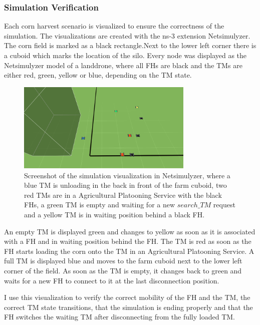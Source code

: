 \subsubsection*{Simulation Verification}
Each corn harvest scenario is visualized to ensure the correctness of the simulation.
The visualizations are created with the ns-3 extension Netsimulyzer.
The corn field is marked as a black rectangle.Next to the lower left corner there is a cuboid which marks the location of the silo.
Every node was displayed as the Netsimulyzer model of a landdrone, where all \ac{FH}s are black and the
\ac{TM}s are either red, green, yellow or blue, depending on the \ac{TM} state.
\begin{figure}[H]%
	\centering
	\includegraphics[width=0.75\textwidth]{figures/platooningScreen}
	\caption{Screenshot of the simulation visualization in Netsimulyzer, where a blue \acf{TM} is unloading in the back in front of the farm cuboid,
		two red \acp{TM} are in a Agricultural Platooning Service with the black \acf{FH}s,
		a green \ac{TM} is empty and waiting for a new $search\_TM$ request and a yellow \ac{TM} is in waiting position behind a black \ac{FH}.}
	\label{fig:PlatooningScreenshot}%
\end{figure}

An empty \ac{TM} is displayed green and changes to yellow as soon as it is associated with a \ac{FH} and in waiting position behind the \ac{FH}.
The \ac{TM} is red as soon as the \ac{FH} starts loading the corn onto the \ac{TM} in an Agricultural Platooning Service.
A full \ac{TM} is displayed blue and moves to the farm cuboid next to the lower left corner of the field.
As soon as the \ac{TM} is empty, it changes back to green and waits for a new \ac{FH} to connect to it at the last disconnection position.

I use this visualization to verify the correct mobility of the \ac{FH} and the \ac{TM}, the correct \ac{TM} state transitions,
that the simulation is ending properly and that the \ac{FH} switches the waiting \ac{TM} after disconnecting
from the fully loaded \ac{TM}.

